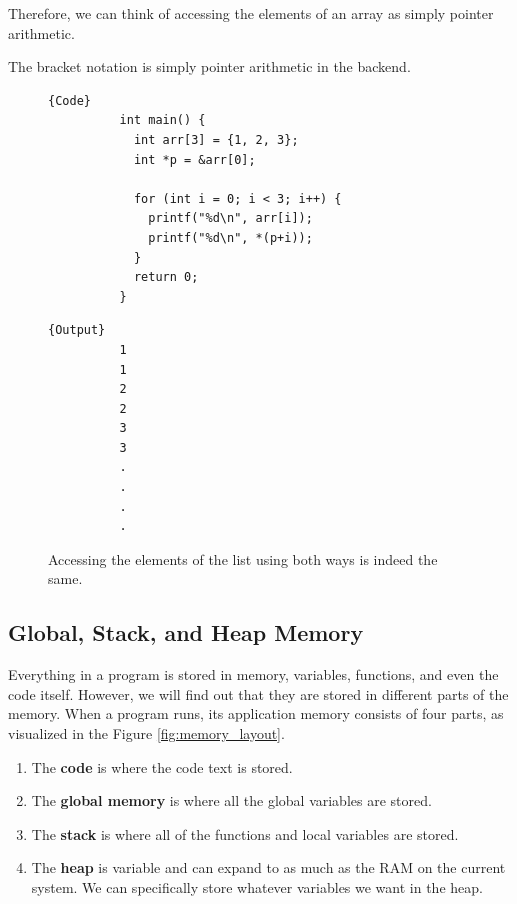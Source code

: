 \documentclass{article}
\begin{document}
    Therefore, we can think of accessing the elements of an array as simply pointer arithmetic. 

    \begin{theorem}
      The bracket notation is simply pointer arithmetic in the backend. 
      \begin{figure}[H]
        \centering 
        \noindent\begin{minipage}{.5\textwidth}
        \begin{lstlisting}[]{Code}
          int main() { 
            int arr[3] = {1, 2, 3}; 
            int *p = &arr[0]; 

            for (int i = 0; i < 3; i++) { 
              printf("%d\n", arr[i]); 
              printf("%d\n", *(p+i)); 
            }
            return 0; 
          }
        \end{lstlisting}
        \end{minipage}
        \hfill
        \begin{minipage}{.49\textwidth}
        \begin{lstlisting}[]{Output}
          1
          1
          2
          2
          3
          3
          .
          .
          .
          .
        \end{lstlisting}
        \end{minipage}
        \caption{Accessing the elements of the list using both ways is indeed the same. } 
        \label{fig:bracket_pointer_arthimetic}
      \end{figure}
    \end{theorem}
   
  \subsection{Global, Stack, and Heap Memory}

    Everything in a program is stored in memory, variables, functions, and even the code itself. However, we will find out that they are stored in different parts of the memory. When a program runs, its application memory consists of four parts, as visualized in the Figure \ref{fig:memory_layout}. 
    \begin{enumerate} 
      \item The \textbf{code} is where the code text is stored. 
      \item The \textbf{global memory} is where all the global variables are stored. 
      \item The \textbf{stack} is where all of the functions and local variables are stored. 
      \item The \textbf{heap} is variable and can expand to as much as the RAM on the current system. We can specifically store whatever variables we want in the heap.
    \end{enumerate}
\end{document}
